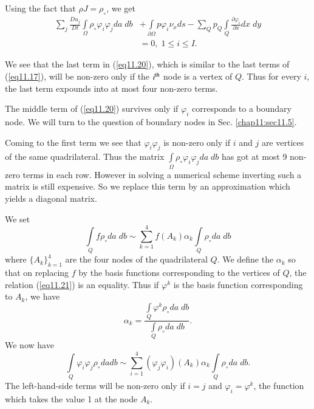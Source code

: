 Using the fact that $\rho J = \rho_\circ$, we get
\begin{align*}
\sum\limits_j \frac{Du_j}{Dt} \int\limits_\Omega \rho_\circ \varphi_i \varphi_j da \; db & + \int\limits_{\partial \Omega} p \varphi_i \nu_x ds - \sum\limits_Q p_Q \int\limits_Q \frac{\partial \varphi_i}{\partial x} dx \; dy \tag{11.20}\label{eq11.20}\\
& = 0, \; 1 \leq i \leq I. 
\end{align*}

We see that the last term in (\ref{eq11.20}), which is similar to the last terms of (\ref{eq11.17}), will be non-zero only if the $i^{\rm th}$ node is a vertex of $Q$. Thus for every $i$, the last term expounds into at most four non-zero terms.

The middle term of (\ref{eq11.20}) survives only if $\varphi_i$ corresponds to a boundary node. We will turn to the question of boundary nodes in Sec. \ref{chap11:sec11.5}. 

Coming to the first term we see that $\varphi_i \varphi_j$ is non-zero only if $i$ and $j$ are vertices of the same quadrilateral. Thus the matrix $\int\limits_\Omega \rho_\circ \varphi_i \varphi_j da \; db$ has got at most 9 non-zero terms in each row. However in solving a numerical scheme inverting such a matrix is still expensive. So we replace this term by an approximation which yields a diagonal matrix.

We set 
\begin{equation*}
\int\limits_Q f \rho_\circ da \; db \sim \sum\limits^4_{k=1} f(A_k)
\alpha_k \int\limits_Q \rho_\circ da \; db \tag{11.21}\label{eq11.21} 
\end{equation*}
where $\{A_k\}^4_{k=1}$ are the four nodes of the quadrilateral $Q$. We define the $\alpha_k$ so that on replacing $f$ by the basis functions corresponding to the vertices of $Q$, the relation (\ref{eq11.21}) is an equality. Thus if $\varphi^k$ is the basis function corresponding to $A_k$, we have 
\begin{equation*}
\alpha_k = \frac{\int\limits_Q \varphi^k \rho_\circ da \; db}{\int\limits_Q \rho_\circ da \; db}. \tag{11.22}\label{eq11.22}
\end{equation*}\pageoriginale
We now have 
$$
\int\limits_Q \varphi_i \varphi_j \rho_\circ da db \sim
\sum\limits^4_{i=1} (\varphi_j \varphi_i) (A_k) \alpha_k \int\limits_Q
\rho_\circ da \; db.  
$$
The left-hand-side terms will be non-zero only if $i = j$ and $\varphi_i = \varphi^k$, the function which takes the value 1 at the node $A_k$.

